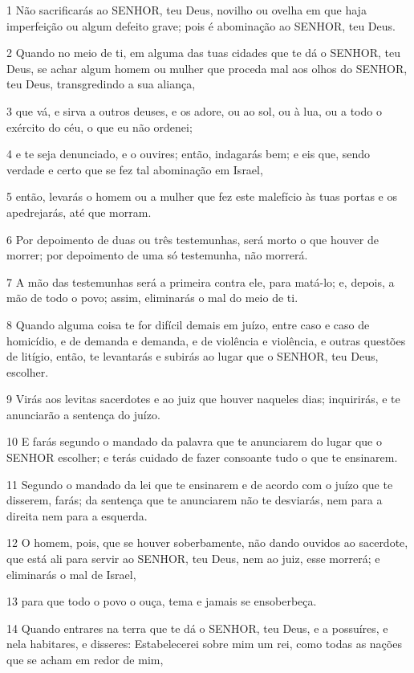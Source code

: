 \par 1 Não sacrificarás ao SENHOR, teu Deus, novilho ou ovelha em que haja imperfeição ou algum defeito grave; pois é abominação ao SENHOR, teu Deus.
\par 2 Quando no meio de ti, em alguma das tuas cidades que te dá o SENHOR, teu Deus, se achar algum homem ou mulher que proceda mal aos olhos do SENHOR, teu Deus, transgredindo a sua aliança,
\par 3 que vá, e sirva a outros deuses, e os adore, ou ao sol, ou à lua, ou a todo o exército do céu, o que eu não ordenei;
\par 4 e te seja denunciado, e o ouvires; então, indagarás bem; e eis que, sendo verdade e certo que se fez tal abominação em Israel,
\par 5 então, levarás o homem ou a mulher que fez este malefício às tuas portas e os apedrejarás, até que morram.
\par 6 Por depoimento de duas ou três testemunhas, será morto o que houver de morrer; por depoimento de uma só testemunha, não morrerá.
\par 7 A mão das testemunhas será a primeira contra ele, para matá-lo; e, depois, a mão de todo o povo; assim, eliminarás o mal do meio de ti.
\par 8 Quando alguma coisa te for difícil demais em juízo, entre caso e caso de homicídio, e de demanda e demanda, e de violência e violência, e outras questões de litígio, então, te levantarás e subirás ao lugar que o SENHOR, teu Deus, escolher.
\par 9 Virás aos levitas sacerdotes e ao juiz que houver naqueles dias; inquirirás, e te anunciarão a sentença do juízo.
\par 10 E farás segundo o mandado da palavra que te anunciarem do lugar que o SENHOR escolher; e terás cuidado de fazer consoante tudo o que te ensinarem.
\par 11 Segundo o mandado da lei que te ensinarem e de acordo com o juízo que te disserem, farás; da sentença que te anunciarem não te desviarás, nem para a direita nem para a esquerda.
\par 12 O homem, pois, que se houver soberbamente, não dando ouvidos ao sacerdote, que está ali para servir ao SENHOR, teu Deus, nem ao juiz, esse morrerá; e eliminarás o mal de Israel,
\par 13 para que todo o povo o ouça, tema e jamais se ensoberbeça.
\par 14 Quando entrares na terra que te dá o SENHOR, teu Deus, e a possuíres, e nela habitares, e disseres: Estabelecerei sobre mim um rei, como todas as nações que se acham em redor de mim,
